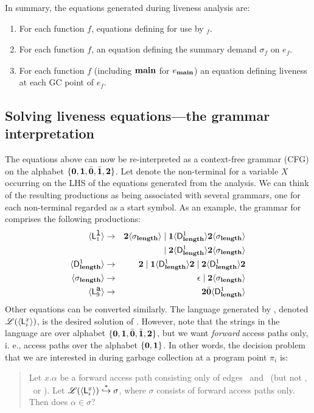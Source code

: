 \documentclass[9pt]{sigplanconf}
\begin{document}
In summary, the equations generated during liveness analysis are:
\begin{enumerate}
\item For each function $\mathit{f}$, equations defining  for
  use by \Lfonly$_{\mathit f}$.
\item For each function $\mathit{f}$, an equation defining the summary
  demand $\sigma_{\mathit f}$ on $e_f$.
\item  For  each  function   $\mathit{f}$  (including  $\mathbf{main}$  for
  $e_{\mathbf{main}}$)  an equation  defining liveness  at each  GC point  of
  $e_{\mathit f}$.
\end{enumerate}
\subsection{Solving liveness equations---the grammar
interpretation}\label{sec:grammar-formulation}
The  equations above can now be re-interpreted as a
context-free grammar (CFG)  on the alphabet $\lbrace\mathbf{0}, \mathbf{1},
\bar{\mathbf{0}}, \bar{\mathbf{1}}, {\mathbf{2}}\rbrace$.  Let   denote the non-terminal
for
a variable  $X$ occurring on  the LHS of the  equations generated
from the analysis.  We can  think of the resulting productions as
being associated with several  grammars, one for each non-terminal
 regarded as a start symbol.  As an example, the
grammar    for      comprises    the   following
productions:
\begin{eqnarray*}
  \langle \mathsf{L}_{{1}}^{\mbox{\tt l}}\rangle  &\rightarrow& 
  {\mathbf{2}}\langle \sigma_{\mathbf{length}}\rangle \mid \mathbf{1} \langle \mathsf{D}_{\mathit {\mathbf{length}}}^{1}\rangle{\ensuremath{{\mathbf{2}}}\ensuremath{\langle \sigma_{\mathbf{length}}\rangle}}  \\
  & & \mid
  {\mathbf{2}}\langle \mathsf{D}_{\mathit {\mathbf{length}}}^{1}\rangle{\ensuremath{{\mathbf{2}}}\ensuremath{\langle \sigma_{\mathbf{length}}\rangle}} \\
  \langle \mathsf{D}_{\mathit {\mathbf{length}}}^{1}\rangle &\rightarrow& {\mathbf{2}} \mid
  \mathbf{1}\langle \mathsf{D}_{\mathit {\mathbf{length}}}^{1}\rangle{\mathbf{2}}
       \mid {\mathbf{2}}\langle \mathsf{D}_{\mathit {\mathbf{length}}}^{1}\rangle{\ensuremath{{\mathbf{2}}}}\\
\langle {\sigma_{\ensuremath{\mathbf{length}}}} \rangle
&\rightarrow&
\epsilon  \mid {\mathbf{2}}\langle{\sigma_{\ensuremath{\mathbf{length}}}}\rangle \\
\langle \mathsf{L}_{{9}}^{\mbox{\tt a}}\rangle &\rightarrow& {\mathbf{2}} \bar{\mathbf{0}} \langle \mathsf{D}_{\mathit {\mathbf{length}}}^{1}\rangle
\end{eqnarray*}
Other equations can be converted similarly.  The language generated by
,  denoted  $\mathscr{L}(\langle \mathsf{L}_{{i}}^{x}\rangle)$, is  the
desired solution  of .  However,  note that the  strings in
the  language are  over alphabet  $\lbrace \mathbf{0},  \mathbf{1},\bar{\mathbf{0}}, \bar{\mathbf{1}},
{\mathbf{2}} \rbrace$, but  we want {\em forward} access paths  only, i. e.,
access paths over the alphabet $\lbrace \mathbf{0}, \mathbf{1} \rbrace$. In
other words,  the decision  problem that we  are interested  in during
garbage collection at a program point $\pi_i$ is:
\begin{quote}
Let  $x.\alpha$ be  a forward  access  path consisting  only of  edges
\acar\    and   \acdr\    (but    not   \bcar, \bcdr\ or \clazy).     Let
$\mathscr{L}(\langle \mathsf{L}_{{i}}^{x}\rangle) \stackrel{*}{\hookrightarrow} \sigma$,
where $\sigma$ consists  of forward access paths only. Then  does $\alpha \in
\sigma$?
\end{quote}
\end{document}
